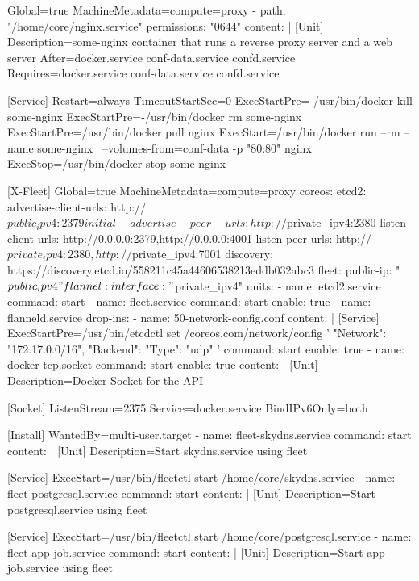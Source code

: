 \begin{codelisting}
\begin{code}
      [X-Fleet]
      Global=true
      MachineMetadata=compute=proxy
  - path: "/home/core/nginx.service"
    permissions: "0644"
    content: |
      [Unit] 
      Description=some-nginx container that runs a reverse proxy server and 
                  a web server
      After=docker.service conf-data.service confd.service
      Requires=docker.service conf-data.service confd.service

      [Service] 
      Restart=always
      TimeoutStartSec=0 
      ExecStartPre=-/usr/bin/docker kill some-nginx 
      ExecStartPre=-/usr/bin/docker rm some-nginx
      ExecStartPre=/usr/bin/docker pull nginx 
      ExecStart=/usr/bin/docker run --rm --name some-nginx \
      --volumes-from=conf-data -p "80:80" nginx 
      ExecStop=/usr/bin/docker stop some-nginx

      [X-Fleet]
      Global=true
      MachineMetadata=compute=proxy
coreos:
  etcd2:
    advertise-client-urls: http://$public_ipv4:2379
    initial-advertise-peer-urls: http://$private_ipv4:2380
    listen-client-urls: http://0.0.0.0:2379,http://0.0.0.0:4001
    listen-peer-urls: http://$private_ipv4:2380,http://$private_ipv4:7001
    discovery: https://discovery.etcd.io/558211c45a44606538213eddb032abc3
  fleet:
    public-ip: "$public_ipv4"
  flannel:
    interface: "$private_ipv4"
  units:
  - name: etcd2.service
    command: start
  - name: fleet.service
    command: start
    enable: true
  - name: flanneld.service
    drop-ins:
    - name: 50-network-config.conf
      content: |
        [Service]
        ExecStartPre=/usr/bin/etcdctl set /coreos.com/network/config 
        '{ "Network": "172.17.0.0/16", "Backend": { "Type": "udp" } }'
    command: start
    enable: true
  - name: docker-tcp.socket
    command: start
    enable: true
    content: |
      [Unit]
      Description=Docker Socket for the API

      [Socket]
      ListenStream=2375
      Service=docker.service
      BindIPv6Only=both

      [Install]
      WantedBy=multi-user.target
  - name: fleet-skydns.service
    command: start
    content: |
      [Unit]
      Description=Start skydns.service using fleet

      [Service]
      ExecStart=/usr/bin/fleetctl start /home/core/skydns.service
  - name: fleet-postgresql.service
    command: start
    content: |
      [Unit]
      Description=Start postgresql.service using fleet

      [Service]
      ExecStart=/usr/bin/fleetctl start /home/core/postgresql.service
  - name: fleet-app-job.service
    command: start
    content: |
      [Unit]
      Description=Start app-job.service using fleet


\end{code}
\end{codelisting}

